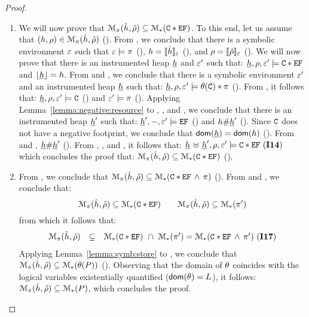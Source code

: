 \begin{proof}
\begin{enumerate}
\item We will now prove that  $\mathcal{M}_{\pi}(\hat{h}, \hat\rho) \subseteq \mathcal{M}_{*}(\mathtt{C} \mathbin{*} \mathtt{EF})$. 
To this end, let us assume that $(h, \rho) \in \mathcal{M}_{\pi}(\hat{h}, \hat\rho)$ (). 
From , we conclude that there is a symbolic environment $\varepsilon$ such that $\varepsilon \models \pi$ (), 
$h = \llbracket \hat{h} \rrbracket_{\varepsilon}$ (), and $\rho = \llbracket \hat\rho \rrbracket_{\varepsilon}$ ().
We will now prove that there is an instrumented heap $\underline{h}$  and $\varepsilon'$ such 
that: $\underline{h}, \rho, \varepsilon' \models \mathtt{C} \mathbin{*} \mathtt{EF}$ and $\lfloor \underline{h} \rfloor = h$. 
From  and , we conclude that there is a symbolic environment $\varepsilon'$ and 
an instrumented heap $\underline{h}$ such that: $\underline{h}, \rho, \varepsilon' \models \theta(\mathtt{C}) \mathbin{*} \pi$ (). 
From , it follows that: $\underline{h}, \rho, \varepsilon' \models \mathtt{C}$ () and $\varepsilon' \models \pi$ ().
Applying Lemma~\ref{lemma:negative:resource} to , , and , we conclude that 
there is an instrumented heap $\underline{h}'$ such that: $\underline{h}', -, \varepsilon' \models \mathtt{EF}$ () 
and $h \# \underline{h}'$ (). 
Since $\mathtt{C}$ does not have a negative footprint, we conclude that $\mathsf{dom}(\underline{h}) = \mathsf{dom}(h)$ (). 
From  and , $\underline{h} \# \underline{h}'$ (). 
From , , and , it follows that: 
$
\underline{h} \, \uplus \, \underline{h}', \rho, \varepsilon' \models \mathtt{C} \mathbin{*} \mathtt{EF} \text{ ({\bf I14})}
$  
which concludes the proof that: $\mathcal{M}_{\pi}(\hat{h}, \hat\rho) \subseteq \mathcal{M}_{*}(\mathtt{C} \mathbin{*} \mathtt{EF})$ (). 
\vspace{4pt}

\item From , we conclude that $\mathcal{M}_{\pi}(\hat{h}, \hat\rho) \subseteq \mathcal{M}_{*}(\mathtt{C} \mathbin{*} \mathtt{EF} \, \wedge \, \pi)$ (). 
From  and , we conclude that: 
$$
  \mathcal{M}_{\pi}(\hat{h}, \hat\rho) \subseteq \mathcal{M}_{*}(\mathtt{C} \mathbin{*} \mathtt{EF})  
  \qquad 
   \mathcal{M}_{\pi}(\hat{h}, \hat\rho) \subseteq \mathcal{M}_{*}(\pi')  
$$
from which it follows that: 
$$ 
 \begin{array}{lcl}
  \mathcal{M}_{\pi}(\hat{h}, \hat\rho) 
           & \subseteq & 
             \mathcal{M}_{*}(\mathtt{C} \mathbin{*} \mathtt{EF}) \ \cap \ \mathcal{M}_{*}(\pi')  = 
             \mathcal{M}_{*}(\mathtt{C} \mathbin{*} \mathtt{EF} \, \wedge \, \pi') \text{ ({\bf I17})}
 \end{array}
$$ 
Applying Lemma~\ref{lemma:symb:store} to , we conclude that 
$\mathcal{M}_{\pi}(\hat{h}, \hat\rho) \subseteq \mathcal{M}_{*}(\theta(P))$ ().
Observing that the domain of $\theta$ coincides with the logical variables existentially quantified ($\mathsf{dom}(\theta) = L$), 
it follows: $\mathcal{M}_{\pi}(\hat{h}, \hat\rho)  \subseteq \mathcal{M}_{*}(P)$, which concludes the proof. 
\end{enumerate}
\end{proof}


